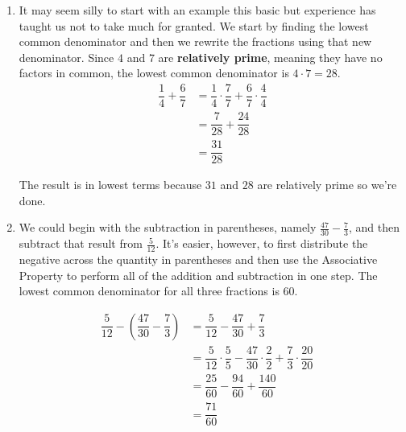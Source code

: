 {
\begin{enumerate}

\item It may seem silly to start with an example this basic but experience has taught us not to take much for granted.  We start by finding the lowest common denominator and then we rewrite the fractions using that new denominator.  Since $4$ and $7$ are {\bf relatively prime}, meaning they have no factors in common, the lowest common denominator is $4 \cdot 7 = 28$.
\begin{align*}
\dfrac{1}{4} + \dfrac{6}{7} & =  \dfrac{1}{4} \cdot \dfrac{7}{7} + \dfrac{6}{7} \cdot \dfrac{4}{4}   \tag*{Equivalent Fractions} \\[5pt]
                            & =  \dfrac{7}{28}  + \dfrac{24}{28}  \tag*{Multiplication of Fractions}\\[5pt]
							& =  \dfrac{31}{28} \tag*{Addition of Fractions}
\end{align*}

The result is in lowest terms because $31$ and $28$ are relatively prime so we're done.



\item  We could begin with the subtraction in parentheses, namely $\frac{47}{30} - \frac{7}{3}$, and then subtract that result from $\frac{5}{12}$.  It's easier, however, to first distribute the negative across the quantity in parentheses and then use the Associative Property to perform all of the addition and subtraction in one step.  The lowest common denominator for all three fractions is $60$.


\begin{align*}
\dfrac{5}{12} - \left(\dfrac{47}{30} - \dfrac{7}{3}\right) & = \dfrac{5}{12} - \dfrac{47}{30} + \dfrac{7}{3} \quad \tag*{Distribute the Negative}\\[5pt]
& =  \dfrac{5}{12} \cdot \dfrac{5}{5} - \dfrac{47}{30} \cdot \dfrac{2}{2} + \dfrac{7}{3} \cdot \dfrac{20}{20} \quad \tag*{Equivalent Fractions}\\[5pt]
& =  \dfrac{25}{60} - \dfrac{94}{60} + \dfrac{140}{60} \quad \tag*{Multiplication of Fractions} \\[6pt]
& =  \dfrac{71}{60} \quad \tag*{Addition and Subtraction of Fractions}
\end{align*}


\end{enumerate}}
